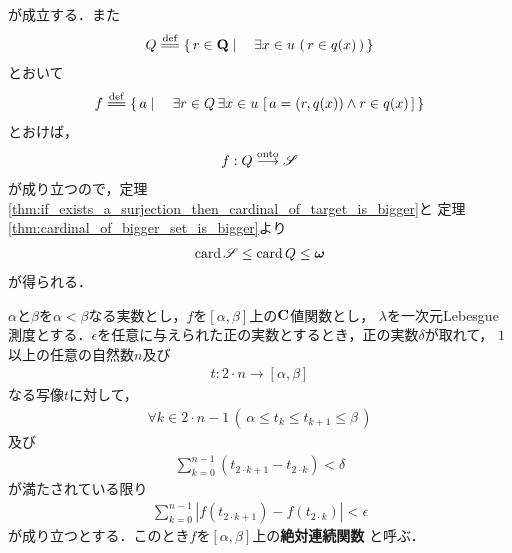 \begin{sketch}
		が成立する．また
		\begin{align}
			Q \defeq \Set{r \in \Q}{\exists x \in u\, \left(\, r \in q(x)\, \right)}
		\end{align}
		とおいて
		\begin{align}
			f \defeq \Set{a}{\exists r \in Q \, \exists x \in u\, \left[\, a = (r,q(x)) \wedge r \in q(x)\, \right]}
		\end{align}
		とおけば，
		\begin{align}
			f: Q \overset{\mathrm{onto}}{\longrightarrow} \mathscr{S}
		\end{align}
		が成り立つので，定理\ref{thm:if_exists_a_surjection_then_cardinal_of_target_is_bigger}と
		定理\ref{thm:cardinal_of_bigger_set_is_bigger}より
		\begin{align}
			\operatorname{card} \mathscr{S} \leq \operatorname{card} Q \leq {\boldsymbol \omega}
		\end{align}
		が得られる．
		\QED
	\end{sketch}
	
	\begin{screen}
		\begin{dfn}[絶対連続関数]
			$\alpha$と$\beta$を$\alpha < \beta$なる実数とし，$f$を$[\alpha,\beta]$上の$\mathbf{C}$値関数とし，
			$\lambda$を一次元Lebesgue測度とする．$\epsilon$を任意に与えられた正の実数とするとき，正の実数$\delta$が取れて，
			$1$以上の任意の自然数$n$及び
			\begin{align}
				t:2 \cdot n \longrightarrow [\alpha,\beta]
			\end{align}
			なる写像$t$に対して，
			\begin{align}
				\forall k \in 2 \cdot n-1\, \left(\, \alpha \leq t_{k} \leq t_{k+1} \leq \beta\, \right)
			\end{align}
			及び
			\begin{align}
				\sum_{k=0}^{n-1} (t_{2 \cdot k + 1} - t_{2 \cdot k}) < \delta
			\end{align}
			が満たされている限り
			\begin{align}
				\sum_{k=0}^{n-1} \left|f(t_{2 \cdot k + 1}) - f(t_{2 \cdot k})\right| < \epsilon
			\end{align}
			が成り立つとする．このとき$f$を$[\alpha,\beta]$上の{\bf 絶対連続関数}
			と呼ぶ．
		\end{dfn}
	\end{screen}
	
